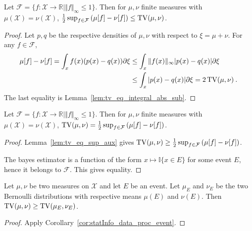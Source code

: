 \begin{lemma}
  \label{lem:tv_eq_sup_aux}
  Let $\mathcal F = \{f : \mathcal X \to \mathbb{R} \mid \Vert f \Vert_\infty \le 1\}$.
  Then for $\mu, \nu$ finite measures with $\mu(\mathcal X) = \nu(\mathcal X)$, $\frac{1}{2} \sup_{f \in \mathcal F} \left( \mu[f] - \nu[f] \right) \le \operatorname{TV}(\mu, \nu)$.
\end{lemma}

\begin{proof}
Let $p,q$ be the respective densities of $\mu, \nu$ with respect to $\xi=\mu+\nu$.
For any $f \in \mathcal F$,
\begin{align*}
\mu[f] - \nu[f]
= \int_x f(x)(p(x) - q(x)) \partial\xi
&\le \int_x \Vert f(x) \Vert_\infty \vert p(x) - q(x) \vert \partial\xi
\\
&\le \int_x \vert p(x) - q(x) \vert \partial\xi
= 2 \operatorname{TV}(\mu, \nu)
\: .
\end{align*}
The last equality is Lemma~\ref{lem:tv_eq_integral_abs_sub}.
\end{proof}


\begin{theorem}
  \label{thm:tv_eq_sup_sub_integral}
  Let $\mathcal F = \{f : \mathcal X \to \mathbb{R} \mid \Vert f \Vert_\infty \le 1\}$.
  Then for $\mu, \nu$ finite measures with $\mu(\mathcal X) = \nu(\mathcal X)$, $\operatorname{TV}(\mu, \nu) = \frac{1}{2} \sup_{f \in \mathcal F} \left( \mu[f] - \nu[f] \right)$.
\end{theorem}

\begin{proof}
Lemma~\ref{lem:tv_eq_sup_aux} gives $\operatorname{TV}(\mu, \nu) \ge \frac{1}{2} \sup_{f \in \mathcal F} \left( \mu[f] - \nu[f] \right)$.

The bayes estimator is a function of the form $x \mapsto \mathbb{I}\{x \in E\}$ for some event $E$, hence it belongs to $\mathcal F$. This gives equality.
\end{proof}


\begin{lemma}
  \label{lem:tv_data_proc_event}
  Let $\mu, \nu$ be two measures on $\mathcal X$ and let $E$ be an event. Let $\mu_E$ and $\nu_E$ be the two Bernoulli distributions with respective means $\mu(E)$ and $\nu(E)$.
  Then $\operatorname{TV}(\mu, \nu) \ge \operatorname{TV}(\mu_E, \nu_E)$.
\end{lemma}

\begin{proof}
Apply Corollary~\ref{cor:statInfo_data_proc_event}.
\end{proof}
